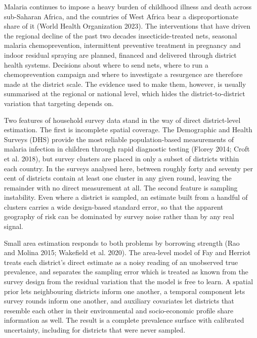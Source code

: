 \documentclass{article}
\begin{document}
Malaria continues to impose a heavy burden of childhood illness and
death across sub-Saharan Africa, and the countries of West Africa bear a
disproportionate share of it (World Health Organization 2023). The
interventions that have driven the regional decline of the past two
decades insecticide-treated nets, seasonal malaria chemoprevention,
intermittent preventive treatment in pregnancy and indoor residual
spraying are planned, financed and delivered through district health
systems. Decisions about where to send nets, where to run a
chemoprevention campaign and where to investigate a resurgence are
therefore made at the district scale. The evidence used to make them,
however, is usually summarised at the regional or national level, which
hides the district-to-district variation that targeting depends on.

Two features of household survey data stand in the way of direct
district-level estimation. The first is incomplete spatial coverage. The
Demographic and Health Surveys (DHS) provide the most reliable
population-based measurements of malaria infection in children through
rapid diagnostic testing (Florey 2014; {Croft et al.} 2018), but survey
clusters are placed in only a subset of districts within each country.
In the surveys analysed here, between roughly forty and seventy per cent
of districts contain at least one cluster in any given round, leaving
the remainder with no direct measurement at all. The second feature is
sampling instability. Even where a district is sampled, an estimate
built from a handful of clusters carries a wide design-based standard
error, so that the apparent geography of risk can be dominated by survey
noise rather than by any real signal.

Small area estimation responds to both problems by borrowing strength
(Rao and Molina 2015; Wakefield et al. 2020). The area-level model of
Fay and Herriot treats each district's direct estimate as a noisy
reading of an unobserved true prevalence, and separates the sampling
error which is treated as known from the survey design from the residual
variation that the model is free to learn. A spatial prior lets
neighbouring districts inform one another, a temporal component lets
survey rounds inform one another, and auxiliary covariates let districts
that resemble each other in their environmental and socio-economic
profile share information as well. The result is a complete prevalence
surface with calibrated uncertainty, including for districts that were
never sampled.
\end{document}
